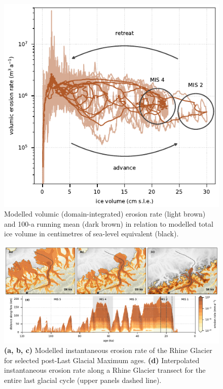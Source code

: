 \documentclass[utf8]{article}
\begin{document}
    \begin{figure}
      \centerline{\includegraphics{alpero_evolution}}
      \caption{%
        Modelled volumic (domain-integrated) erosion rate (light brown) and 100-a
        running mean (dark brown) in relation to modelled total ice volume in
        centimetres of sea-level equivalent (black).}
      \label{fig:evolution}
    \end{figure}

    \begin{figure}
      \centerline{\includegraphics{alpero_transects}}
      \caption{%
        \textbf{(a, b, c)} Modelled instantaneous erosion rate of the Rhine
          Glacier for selected post-Last Glacial Maximum ages.
        \textbf{(d)} Interpolated instantaneous erosion rate along a Rhine
          Glacier transect for the entire last glacial cycle (upper panels
          dashed line).}
      \label{fig:transects}
    \end{figure}
\end{document}

